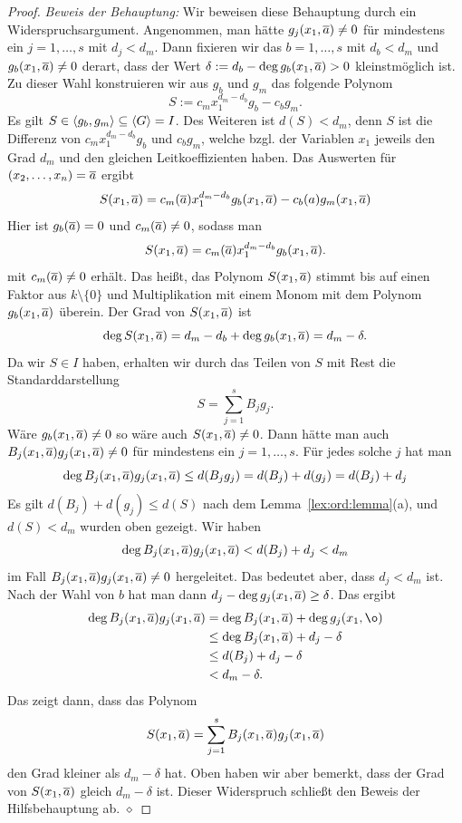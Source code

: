 \documentclass[11pt]{article}
\numberwithin{equation}{section}
\begin{document}
\begin{proof}
	\emph{Beweis der Behauptung:} Wir beweisen diese Behauptung durch ein Widerspruchsargument. Angenommen, man hätte $g_j(x_1,\overline{a}) \ne 0$ für mindestens ein $j =1,\ldots,s$ mit $d_j < d_m$. Dann fixieren wir das $b =1,\ldots, s$ mit $d_b < d_m$ und $g_b(x_1,\overline{a}) \ne 0$ derart, dass der Wert $\delta := d_b- \deg g_b(x_1,\overline{a}) >0$ kleinstmöglich ist. Zu dieser Wahl konstruieren wir aus $g_b$ und $g_m$ das folgende Polynom 
	\[
		S := c_m x_1^{d_m-d_b} g_b - c_b g_m. 
	\]
	Es gilt $S \in \left< g_b,g_m \right> \subseteq \left< G \right> = I$. Des Weiteren ist $d(S) < d_m$, denn $S$ ist die Differenz von $c_m x_1^{d_m - d_b} g_b$ und $c_b g_m$, welche bzgl. der Variablen $x_1$ jeweils den Grad $d_m$ und den gleichen Leitkoeffizienten haben.  Das Auswerten für $(x_2,\ldots,x_n) = \overline{a}$ ergibt 
	\[
		S(x_1,\overline{a}) = c_m(\overline{a}) x_1^{d_m - d_b} g_b(x_1,\overline{a}) - c_b(a) g_m(x_1,\overline{a}) 
	\]
	Hier ist $g_b(\overline{a}) = 0$ und $c_m(\overline{a}) \ne0$, sodass man 
	\[
		S(x_1,\overline{a}) = c_m(\overline{a}) x_1^{d_m -d_b} g_b(x_1,\overline{a}). 
	\]
	mit $c_m(\overline{a}) \ne 0$ erhält. Das heißt, das Polynom $S(x_1,\overline{a})$ stimmt bis auf einen Faktor aus $k \setminus \{0\}$ und Multiplikation mit einem Monom mit dem Polynom $g_b(x_1,\overline{a})$ überein. Der Grad von $S(x_1,\overline{a})$ ist
	\[
		\deg S(x_1,\overline{a}) = d_m - d_b + \deg g_b(x_1,\overline{a})  = d_m - \delta. 
	\]
	Da wir $S \in I$ haben, erhalten wir durch das Teilen von $S$ mit Rest die Standarddarstellung 
	\[
		S = \sum_{j=1}^s B_j g_j. 
	\]
	Wäre $g_b(x_1,\overline{a}) \ne 0$ so wäre auch $S(x_1,\overline{a}) \ne 0$. Dann hätte man auch $B_j(x_1,\overline{a}) g_j(x_1,\overline{a}) \ne 0$ für mindestens ein $j = 1,\ldots, s$. Für jedes solche $j$ hat man 
	\[
		 \deg B_j(x_1,\overline{a}) g_j(x_1,\overline{a}) \le d( B_j g_j)  = d(B_j) + d(g_j)  = d(B_j) + d_j
	\]
	Es gilt $d(B_j) + d(g_j) \le d(S)$ nach dem Lemma~\ref{lex:ord:lemma}(a), und $d(S) < d_m$ wurden oben gezeigt. Wir haben 
	\[
		\deg B_j(x_1,\overline{a}) g_j(x_1,\overline{a}) < d(B_j) + d_j < d_m
	\]
	im Fall $B_j(x_1,\overline{a}) g_j(x_1,\overline{a}) \ne 0$ hergeleitet. Das bedeutet aber, dass $d_j < d_m$ ist. Nach der Wahl von $b$ hat man dann $d_j - \deg g_j(x_1,\overline{a}) \ge \delta$. Das ergibt 
	\begin{align*}
		\deg B_j(x_1,\oa) g_j(x_1,\oa) &  = \deg B_j(x_1,\oa) + \deg g_j(x_1,\o) 
		\\ & \le \deg B_j(x_1,\oa) + d_j - \delta 
		\\ & \le d(B_j)  + d_j - \delta 
		\\ & < d_m - \delta. 
	\end{align*}
	Das zeigt dann, dass das Polynom 
	\[
			S(x_1,\overline{a}) = \sum_{j=1}^s B_j(x_1,\overline{a}) g_j(x_1,\overline{a})
	\]
	den Grad kleiner als $d_m - \delta$ hat. Oben haben wir aber bemerkt, dass der Grad von $S(x_1,\overline{a})$ gleich $d_m - \delta$ ist. Dieser Widerspruch schließt den Beweis der Hilfsbehauptung ab. \hfill$\diamond$
	

\end{proof}
\end{document}
